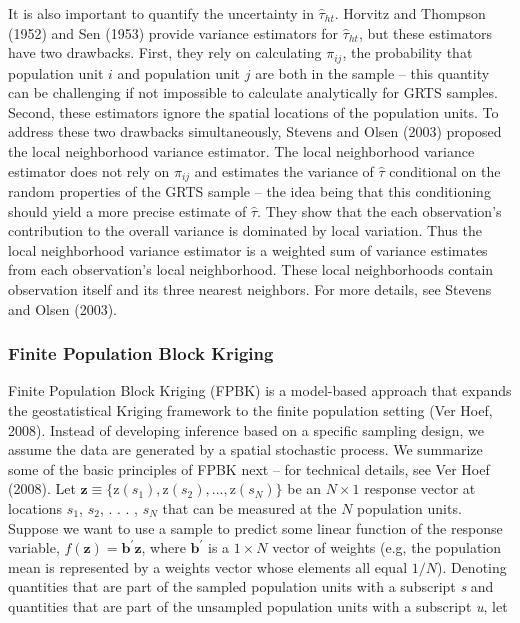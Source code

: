\documentclass[]{elsarticle} %
\begin{document}
It is also important to quantify the uncertainty in \(\hat{\tau}_{ht}\).
Horvitz and Thompson (1952) and Sen (1953) provide variance estimators
for \(\hat{\tau}_{ht}\), but these estimators have two drawbacks. First,
they rely on calculating \(\pi_{ij}\), the probability that population
unit \(i\) and population unit \(j\) are both in the sample -- this
quantity can be challenging if not impossible to calculate analytically
for GRTS samples. Second, these estimators ignore the spatial locations
of the population units. To address these two drawbacks simultaneously,
Stevens and Olsen (2003) proposed the local neighborhood variance
estimator. The local neighborhood variance estimator does not rely on
\(\pi_{ij}\) and estimates the variance of \(\hat{\tau}\) conditional on
the random properties of the GRTS sample -- the idea being that this
conditioning should yield a more precise estimate of \(\hat{\tau}\).
They show that the each observation's contribution to the overall
variance is dominated by local variation. Thus the local neighborhood
variance estimator is a weighted sum of variance estimates from each
observation's local neighborhood. These local neighborhoods contain
observation itself and its three nearest neighbors. For more details,
see Stevens and Olsen (2003).

\hypertarget{finite-population-block-kriging}{%
\subsubsection{Finite Population Block
Kriging}\label{finite-population-block-kriging}}

Finite Population Block Kriging (FPBK) is a model-based approach that
expands the geostatistical Kriging framework to the finite population
setting (Ver Hoef, 2008). Instead of developing inference based on a
specific sampling design, we assume the data are generated by a spatial
stochastic process. We summarize some of the basic principles of FPBK
next -- for technical details, see Ver Hoef (2008). Let
\({\mathbf{z} \equiv \{\text{z}(s_1), \text{z}(s_2), . . . , \text{z}(s_N) \}}\)
be an \(N \times 1\) response vector at locations \(s_1\), \(s_2\), . .
. , \(s_N\) that can be measured at the \(N\) population units. Suppose
we want to use a sample to predict some linear function of the response
variable, \(f(\mathbf{z}) = \mathbf{b}^\prime \mathbf{z}\), where
\(\mathbf{b}^\prime\) is a \(1 \times N\) vector of weights (e.g, the
population mean is represented by a weights vector whose elements all
equal \(1 / N\)). Denoting quantities that are part of the sampled
population units with a subscript \emph{s} and quantities that are part
of the unsampled population units with a subscript \emph{u}, let
\end{document}
